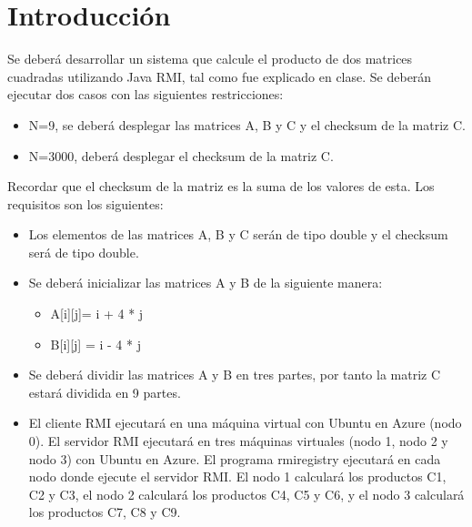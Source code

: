 \documentclass[11pt]{article}
\begin{document}
	\section{Introducción}
		Se deberá desarrollar un sistema que calcule el producto de dos matrices cuadradas utilizando Java RMI, tal como fue explicado en clase. Se deberán ejecutar dos casos con las siguientes restricciones:
		\begin{itemize}
			\item N=9, se deberá desplegar las matrices A, B y C y el checksum de la matriz C.
			\item N=3000, deberá desplegar el checksum de la matriz C.
		\end{itemize}
		Recordar que el checksum de la matriz es la suma de los valores de esta. Los requisitos son los siguientes:
		\begin{itemize}
			\item Los elementos de las matrices A, B y C serán de tipo double y el checksum será de tipo double.
			\item Se deberá inicializar las matrices A y B de la siguiente manera:
				\begin{itemize}
					\item A[i][j]= i + 4 * j
					\item B[i][j] = i - 4 * j
				\end{itemize}
			\item Se deberá dividir las matrices A y B en tres partes, por tanto la matriz C estará dividida en 9 partes.
			\item El cliente RMI ejecutará en una máquina virtual con Ubuntu en Azure (nodo 0). El servidor RMI ejecutará en tres máquinas virtuales (nodo 1, nodo 2 y nodo 3) con Ubuntu en Azure. El programa rmiregistry ejecutará en cada nodo donde ejecute el servidor RMI. El nodo 1 calculará los productos C1, C2 y C3, el nodo 2 calculará los productos C4, C5 y C6, y el nodo 3 calculará los productos C7, C8 y C9.
		\end{itemize}
\end{document}
